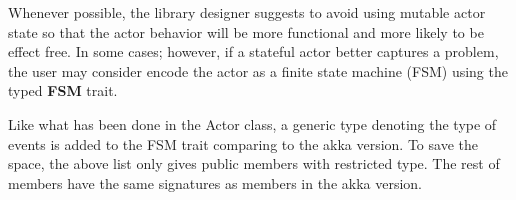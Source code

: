 Whenever possible, the library designer suggests to avoid using mutable actor state so that the actor behavior will be more functional and more likely to be effect free.  In some cases; however, if a stateful actor better captures a problem, the user may consider encode the actor as a finite state machine (FSM) using the typed \textbf{FSM} trait.

Like what has been done in the Actor class, a generic type denoting the type of events is added to the FSM trait comparing to the akka version.  To save the space, the above list only gives public members with restricted type.  The rest of members have the same signatures as members in the akka version.

\begin{comment}
\section{Library Implementation}
\label{implementation}

\subsection{Programming Patterns for the Implementation}
To reuse the significant amount of work done in the akka project \cite{akka_doc} and provide consistent yet better typed APIs, most classes in \S\ref{actor} are implemented using the delegation pattern, employing a suitable akka instance as the value of an immutable field.  Unfortunately, the delegation pattern cannot be applied to both \textbf{Actor} and \textbf{ActorContext} as they are initialised simultaneously in a special way in the akka implementation.  To resolve the deadlock when initialising an actor, the library designer decided to implement the \textbf{Actor} class via inheritance.  Using inheritance means all poorly typed features in the akka \textbf{Actor} are inherited to the type-parametrised actor library.  Fortunately, different from using members in the \textbf{ActorContext} class, using members in the \textbf{Actor} class usually not effects the outside of an actor.  The library designer further provides an implementation for the protected \textit{receive} method inherited form the akka \textbf{Actor} class.  By doing this, an explicit \textbf{override} annotation is required if a user would like overrides the implementation of \textit{receive} method for a good reason.


\subsection{Code and Type Evolution}
\label{type_evolution}
Erlang/OTP \cite{OTP} provides a sophisticate mechanism for hot code swap on any OTP process via the code\_change/3 function.  In akka, hot code swap is only partly supported for actor behaviors via pushing or popping handlers to and from a handler stack.  Although a \textbf{Wrapper} class has been implemented for simulating Erlang/OTP style hot code swap, it is not used in the current implementation which is aiming at providing  APIs similar to those in the akka library.


\end{comment}

